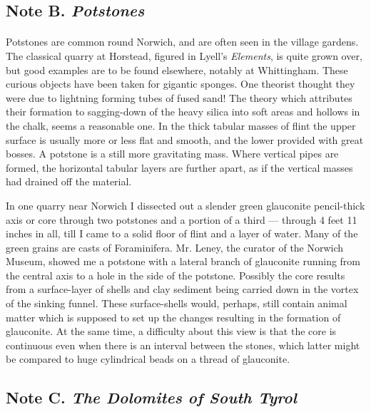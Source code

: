 \documentclass[a4paper, 12pt, oneside]{article}
\begin{document}
\subsection{Note B. \emph{Potstones}}
\paragraph{}
Potstones are common round Norwich, and are often seen in the village gardens. The classical quarry at Horstead, figured in Lyell's \emph{Elements}, is quite grown over, but good examples are to be found elsewhere, notably at Whittingham. These curious objects have been taken for gigantic sponges. One theorist thought they were due to lightning forming tubes of fused sand! The theory which attributes their formation to sagging-down of the heavy silica into soft areas and hollows in the chalk, seems a reasonable one. In the thick tabular masses of flint the upper surface is usually more or less flat and smooth, and the lower provided with great bosses. A potstone is a still more gravitating mass. Where vertical pipes are formed, the horizontal tabular layers are further apart, as if the vertical masses had drained off the material.

In one quarry near Norwich I dissected out a slender green glauconite pencil-thick axis or core through two potstones and a portion of a third --- through 4 feet 11 inches in all, till I came to a solid floor of flint and a layer of water. Many of the green grains are casts of Foraminifera. Mr. Leney, the curator of the Norwich Museum, showed me a potstone with a lateral branch of glauconite running from the central axis to a hole in the side of the potstone. Possibly the core results from a surface-layer of shells and clay sediment being carried down in the vortex of the sinking funnel. These surface-shells would, perhaps, still contain animal matter which is supposed to set up the changes resulting in the formation of glauconite. At the same time, a difficulty about this view is that the core is continuous even when there is an interval between the stones, which latter might be compared to huge cylindrical beads on a thread of glauconite.

\subsection{Note C. \emph{The Dolomites of South Tyrol}}
\end{document}
